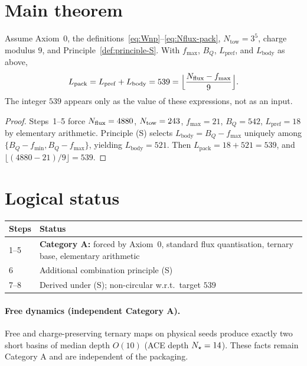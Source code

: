 \section{Main theorem}

\begin{theorem}
\label{thm:foundational-packaging}
Assume Axiom~0, the definitions~\eqref{eq:Wnp}--\eqref{eq:Nflux-pack},
\(N_{\mathrm{tow}}=3^{5}\), charge modulus \(9\), and Principle~\ref{def:principle-S}.
With \(f_{\max}\), \(B_{Q}\), \(L_{\mathrm{pref}}\), and \(L_{\mathrm{body}}\) as above,
\[
L_{\mathrm{pack}}
=
L_{\mathrm{pref}}+L_{\mathrm{body}}
=
539
=
\Bigl\lfloor\frac{N_{\mathrm{flux}}-f_{\max}}{9}\Bigr\rfloor.
\]
The integer \(539\) appears only as the value of these expressions, not as an input.
\end{theorem}

\begin{proof}
Steps~1--5 force \(N_{\mathrm{flux}}=4880\), \(N_{\mathrm{tow}}=243\), \(f_{\max}=21\),
\(B_{Q}=542\), \(L_{\mathrm{pref}}=18\) by elementary arithmetic.
Principle (S) selects \(L_{\mathrm{body}}=B_{Q}-f_{\max}\) uniquely among
\(\{B_{Q}-f_{\min},B_{Q}-f_{\max}\}\), yielding \(L_{\mathrm{body}}=521\).
Then \(L_{\mathrm{pack}}=18+521=539\), and \(\lfloor(4880-21)/9\rfloor=539\).
\end{proof}

\section{Logical status}

\begin{center}
\begin{tabular}{@{}lp{}@{}}
\toprule
Steps & Status \\
\midrule
1--5 & \textbf{Category A:} forced by Axiom~0, standard flux quantisation, ternary base, elementary arithmetic \\
6 & Additional combination principle (S) \\
7--8 & Derived under (S); non-circular w.r.t.\ target \(539\) \\
\bottomrule
\end{tabular}
\end{center}

\paragraph{Free dynamics (independent Category A).}
Free and charge-preserving ternary maps on physical seeds produce exactly two short basins of median depth \(O(10)\) (ACE depth \(N_{\star}=14\)). These facts remain Category A and are independent of the packaging.

